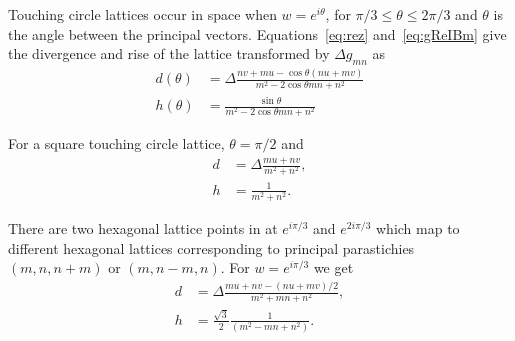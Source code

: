 \begin{jAnswer}
Touching circle lattices occur in  space when $w=e^{i\theta}$, for $\pi/3\leq\theta\leq2\pi/3$ and $\theta$ is the angle between the principal vectors. 
Equations~\eqref{eq:rez} and~\eqref{eq:gReIBm} give the divergence and rise of the lattice transformed by $\Delta g_{mn}$ as 
\begin{align}
	d(\theta) &= 
	\Delta \frac{n v + m u	- \cos\theta ( n u + m v)}{m^2-2 \cos \theta mn +n^2   } 
	\\
	h(\theta) &=
	\frac{	\sin\theta}{m^2-2 \cos \theta mn +n^2   }
	\label{eq:tchd}
\end{align}

For a square touching circle lattice, $\theta=\pi/2$ and 
\begin{align}
	d &= \Delta \frac{ m u +  n v   }{m^2 +  n^2},
	\\
	h  &= \frac{1}{m^2 + n^2}.
\end{align}

There are two hexagonal lattice points in  at $e^{i\pi/3}$ and $e^{2i\pi/3}$ which map to different hexagonal lattices corresponding to principal parastichies  $(m,n,n+m)$ or  $(m,n-m,n)$. For $w= e^{i\pi/3}$ we get
	\begin{align}
	d &= \Delta \frac{ m u +  n v- (n u + mv)/2   }{m^2 + m n + n^2},
	\\
	h  &= \frac{\sqrt{3}}{2} \frac{1}{\left(m^2 -  mn +n^2 \right)}  .
	\end{align}
	
\end{jAnswer}

